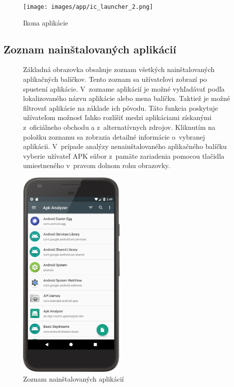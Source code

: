 \begin{figure}[htb]
	\centering
    \texttt{[image: images/app/ic\_launcher\_2.png]}
	\caption{Ikona aplikácie}
	\label{fig:icon}
\end{figure}


\subsection{Zoznam nainštalovaných aplikácií}
\begin{figure}[H]
\begin{minipage}[t]{0.48\textwidth}
Základná obrazovka obsahuje zoznam všetkých nainštalovaných aplikačných balíčkov. Tento zoznam sa užívateľovi zobrazí po spustení aplikácie. V~zozname aplikácií je možné vyhľadávať podľa lokalizovaného názvu aplikácie alebo mena balíčku. Taktiež je možné filtrovať aplikácie na základe ich pôvodu. Táto funkcia poskytuje užívateľom možnosť ľahko rozlíšiť medzi aplikáciami získanými z~oficiálneho obchodu a z~alternatívnych zdrojov. Kliknutím na položku zoznamu sa zobrazia detailné informácie o~vybranej aplikácii. V~prípade analýzy nenainštalovaného aplikačného balíčku vyberie užívateľ APK súbor z~pamäte zariadenia pomocou tlačidla umiestneného v~pravom dolnom rohu obrazovky.
\end{minipage}%
\hfill
\centering
\begin{minipage}[t][][b]{0.45\textwidth}
\centering
\includegraphics[width=5.2cm]{images/app/list_device.png}
\centering
\caption{Zoznam nainštalovaných aplikácií}
\label{fig:app-list}
\end{minipage}%
\end{figure}

